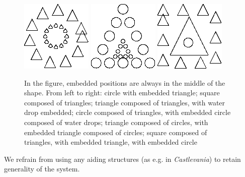\begin{figure}[p]
\centering
\includegraphics[width=.3\linewidth]{ext/images/comp_in_comp.png}
\quad
\includegraphics[width=.3\linewidth]{ext/images/comp_in_comp2.png}
\quad
\includegraphics[width=.3\linewidth]{ext/images/triple.png}
\caption{In the figure, embedded positions are always in the middle of the shape. From left to right: circle with embedded triangle; square composed of triangles; triangle composed of triangles, with water drop embedded; circle composed of triangles, with embedded circle composed of water drops; triangle composed of circles, with embedded triangle composed of circles; square composed of triangles, with embedded triangle, with embedded circle}
\label{fig:examples}
\end{figure}


We refrain from using any aiding structures (as e.g. in \emph{Castlevania}) to retain generality of the system.

